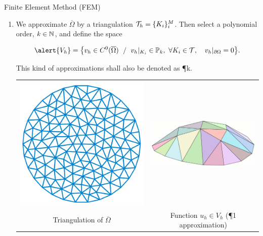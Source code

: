 \begin{frame}{ Finite Element Method (FEM)}
  \begin{enumerate}
  \item We approximate $\overline\Omega$ by a \alert{triangulation
    ${\cal T}_h= \{K_i\}_{i}^M$}. Then select a polynomial order,
    \alert{$k\in{\mathbb N}$}, and define the space
    \begin{BlockNoTitle}
      \vspace{-0.5em}
      $$
      \alert{V_h} = \big\{ v_h\in C^0(\overline\Omega) \;\st\;
      v_h|_{K_i}\in\mathbb{P}_k, \ \forall K_i \in {\cal T}, \quad
      v_h|_{\partial\Omega}=0 \big\}.
      $$
    \end{BlockNoTitle}

    \medskip
    This kind of approximations shall also be denoted as \alert{\P{k}}.
    \medskip

    \setlength{\tabcolsep}{1.5em}
    \begin{center}
      \begin{tabular}{cc}
        \centering
        \includegraphics[height=0.25\linewidth]{img/FE_triangulation}
        &
          \includegraphics[height=0.18\linewidth]{img/FE_function_3d}
        \\
        {\scriptsize  Triangulation of $\overline\Omega$}
        &
          {\scriptsize Function $u_h \in V_h$ (\P1 approximation)}
      \end{tabular}
    \end{center}

  \end{enumerate}
\end{frame}

